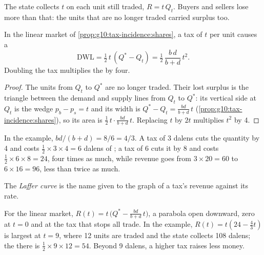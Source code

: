 The state collects $t$ on each unit still traded, $R = t\,Q_t$. Buyers and sellers lose more than that: the units that are no longer traded carried surplus too.

\begin{proposition}\label{prop:g10:tax-incidence:square}
In the linear market of \cref{prop:g10:tax-incidence:shares}, a tax of $t$ per unit causes a 
\[
  \mathrm{DWL} = \tfrac12\, t\,(Q^* - Q_t) = \tfrac12\,\frac{b\,d}{b + d}\,t^2 .
\]
Doubling the tax multiplies the  by four.
\end{proposition}
\begin{proof}
The units from $Q_t$ to $Q^*$ are no longer traded. Their lost surplus is the triangle between the demand and supply lines from $Q_t$ to $Q^*$: its vertical side at
$Q_t$ is the wedge $p_b - p_s = t$ and its width is $Q^* - Q_t = \frac{bd}{b+d}\,t$ (\cref{prop:g10:tax-incidence:shares}), so its area is $\tfrac12\,t \cdot
\frac{bd}{b+d}\,t$. Replacing $t$ by $2t$ multiplies $t^2$ by 4.
\end{proof}

In the example, $bd/(b + d) = 8/6 = 4/3$. A tax of 3 dalens cuts the quantity by 4 and costs $\tfrac12 \times 3 \times 4 = 6$ dalens of ; a tax of 6 cuts
it by 8 and costs $\tfrac12 \times 6 \times 8 = 24$, four times as much, while revenue goes from $3 \times 20 = 60$ to $6 \times 16 = 96$, less than twice as much.

\begin{definition}\label{def:g10:tax-incidence:laffer}
The \emph{Laffer curve} is the name given to the graph of a tax's revenue against its rate.
\end{definition}

For the linear market, $R(t) = t\,\big(Q^* - \tfrac{bd}{b+d}\,t\big)$, a parabola open downward, zero at $t = 0$ and at the tax that stops all trade. In the example,
$R(t) = t(24 - \tfrac43 t)$ is largest at $t = 9$, where 12 units are traded and the state collects 108 dalens; the  there is $\tfrac12 \times 9 \times 12
= 54$. Beyond 9 dalens, a higher tax raises less money.

